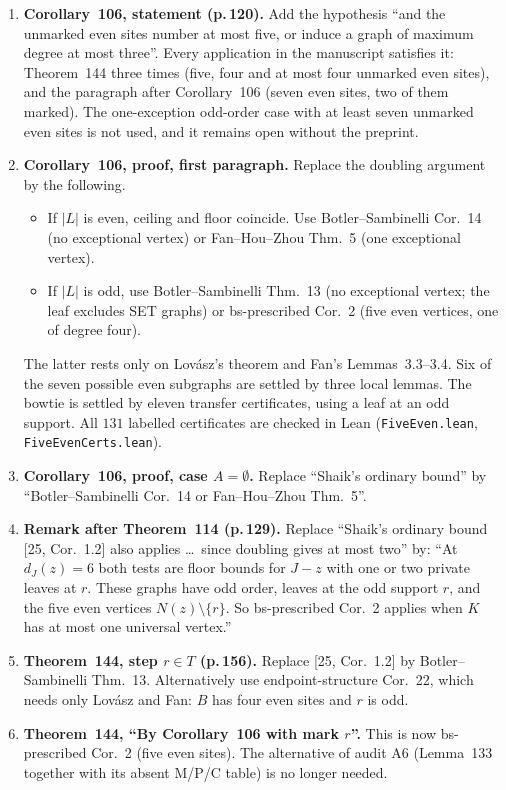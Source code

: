 \documentclass[11pt]{amsart}
\begin{document}
\begin{enumerate}
\item \textbf{Corollary~106, statement (p.\,120).} Add the hypothesis ``and the unmarked even sites number
at most five, or induce a graph of maximum degree at most three''. Every application in the manuscript
satisfies it: Theorem~144 three times (five, four and at most four unmarked even sites), and the
paragraph after Corollary~106 (seven even sites, two of them marked). The one-exception odd-order case
with at least seven unmarked even sites is not used, and it remains open without the preprint.
\item \textbf{Corollary~106, proof, first paragraph.} Replace the doubling argument by the following.
\begin{itemize}
\item If $|L|$ is even, ceiling and floor coincide. Use Botler--Sambinelli Cor.~14 (no exceptional
vertex) or Fan--Hou--Zhou Thm.~5 (one exceptional vertex).
\item If $|L|$ is odd, use Botler--Sambinelli Thm.~13 (no exceptional vertex; the leaf excludes SET
graphs) or bs-prescribed Cor.~2 (five even vertices, one of degree four).
\end{itemize}
The latter rests only on Lov\'asz's theorem and Fan's Lemmas~3.3--3.4. Six of the seven possible
even subgraphs are settled by three local lemmas. The bowtie is settled by eleven transfer certificates,
using a leaf at an odd support. All $131$ labelled certificates are checked in Lean
(\texttt{FiveEven.lean}, \texttt{FiveEvenCerts.lean}).
\item \textbf{Corollary~106, proof, case $A=\emptyset$.} Replace ``Shaik's ordinary bound'' by
``Botler--Sambinelli Cor.~14 or Fan--Hou--Zhou Thm.~5''.
\item \textbf{Remark after Theorem~114 (p.\,129).} Replace ``Shaik's ordinary bound [25, Cor.~1.2] also
applies \ldots\ since doubling gives at most two'' by: ``At $d_J(z)=6$ both tests are floor bounds for
$J-z$ with one or two private leaves at $r$. These graphs have odd order, leaves at the odd support $r$,
and the five even vertices $N(z)\setminus\{r\}$. So bs-prescribed Cor.~2 applies when $K$ has at most one
universal vertex.''
\item \textbf{Theorem~144, step $r\in T$ (p.\,156).} Replace [25, Cor.~1.2] by Botler--Sambinelli Thm.~13.
Alternatively use endpoint-structure Cor.~22, which needs only Lov\'asz and Fan: $B$ has four even
sites and $r$ is odd.
\item \textbf{Theorem~144, ``By Corollary~106 with mark $r$''.} This is now bs-prescribed Cor.~2 (five
even sites). The alternative of audit A6 (Lemma~133 together with its absent M/P/C table) is no longer
needed.
\end{enumerate}
\end{document}
